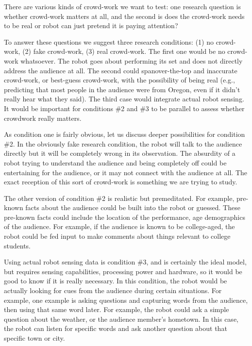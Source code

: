 \documentclass[onecolumn, draftclsnofoot,10pt, compsoc]{IEEEtran}
\begin{document}
There are various kinds of crowd-work we want to test: one research question is whether crowd-work matters at all, and the second is does the crowd-work needs to be real or robot can just pretend it is paying attention?

To answer these questions we suggest three research conditions: (1) no crowd-work, (2) fake crowd-work, (3) real crowd-work. The first one would be no crowd-work whatsoever. The robot goes about performing its set and does not directly address the audience at all. The second could spanover-the-top and inaccurate crowd-work, or best-guess crowd-work, with the possibility of being real (e.g., predicting that most people in the audience were from Oregon, even if it didn't really hear what they said). The third case would integrate actual robot sensing. It would be important for conditions \#2 and \#3 to be parallel to assess whether crowdwork really matters.

As condition one is fairly obvious, let us discuss deeper possibilities for condition \#2. In the obviously fake research condition, the robot will talk to the audience directly but it will be completely wrong in its observation. The absurdity of a robot trying to understand the audience and being completely off could be entertaining for the audience, or it may not connect with the audience at all. The exact reception of this sort of crowd-work is something we are trying to study.

The other version of condition \#2 is realistic but premeditated. For example, pre-known facts about the audience could be built into the robot or guessed. These pre-known facts could include the location of the performance, age demographics of the audience. For example, if the audience is known to be college-aged, the robot could be fed input to make comments about things relevant to college students.

Using actual robot sensing data is condition \#3, and is certainly the ideal model, but requires sensing capabilities, processing power and hardware, so it would be good to know if it is really necessary. In this condition, the robot would be actually looking for cues from the audience during certain situations. For example, one example is asking questions and capturing words from the audience, then using that same word later. For example, the robot could ask a simple question about the weather, or the audience member's hometown. In this case, the robot can listen for specific words and ask another question about that specific town or city.
\end{document}
